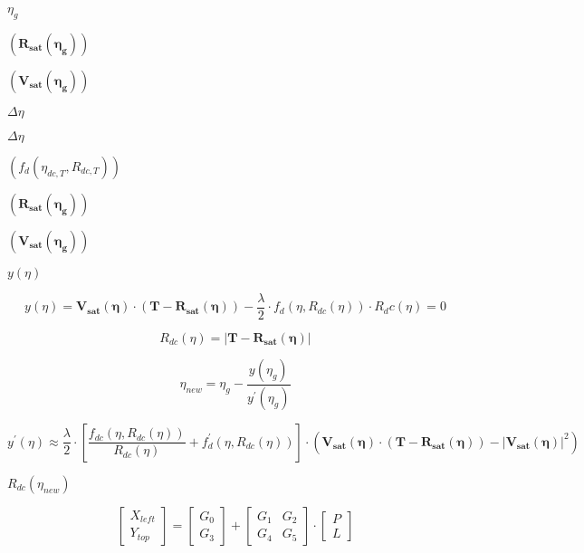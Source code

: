 \documentclass{article}
\begin{document}
$\eta_g$
\pagebreak

$\left( \mathbf{R_{sat}\left( \eta_g\right)} \right)$
\pagebreak

$ \left( \mathbf{V_{sat}\left( \eta_g \right)} \right)$
\pagebreak

$\Delta \eta $
\pagebreak

$\Delta \eta$
\pagebreak

$\left( f_d\left(\eta_{dc,T}, R_{dc,T}\right)\right)$
\pagebreak

$\left( \mathbf{R_{sat}\left( \eta_g \right)} \right)$
\pagebreak

$\left( \mathbf{V_{sat}\left( \eta_g \right)} \right)$
\pagebreak

$y\left( \eta \right)$
\pagebreak

\[ y\left( \eta \right) = \mathbf{V_{sat}\left(\eta\right)} \cdot \left( \mathbf{T} - \mathbf{R_{sat}\left( \eta \right)}\right) - \frac{\lambda}{2} \cdot f_d\left( \eta, R_{dc}\left(\eta\right)\right) \cdot R_dc\left( \eta \right) = 0 \]
\pagebreak

\[ R_{dc}\left(\eta \right) = \left| \mathbf{T} - \mathbf{R_{sat}\left(\eta\right)}\right| \]
\pagebreak

\[ \eta_{new} = \eta_g - \frac{y\left( \eta_g \right)}{y^{\prime}\left( \eta_g\right)} \]
\pagebreak

\[ y^{\prime}\left( \eta \right) \approx \frac{\lambda}{2} \cdot \left[ \frac{ f_{dc}\left( \eta, R_{dc}\left( \eta \right) \right)}{R_{dc}\left( \eta \right)} + f_d^{\prime}\left( \eta, R_{dc}\left( \eta \right) \right) \right] \cdot \left( \mathbf{V_{sat}\left( \eta \right)} \cdot \left( \mathbf{T} - \mathbf{R_{sat}\left(\eta\right)} \right) - \left| \mathbf{V_{sat}\left( \eta \right)}\right|^2 \right) \]
\pagebreak

$R_{dc}\left( \eta_{new} \right)$
\pagebreak

\[ \left[ \begin{array}{c} X_{left} \\ Y_{top} \end{array} \right] = \left[ \begin{array}{c} G_0 \\ G_3 \end{array}\right] + \left[ \begin{array}{cc} G_1 & G_2 \\ G_4 & G_5 \end{array} \right] \cdot \left[ \begin{array}{c} P \\ L \end{array} \right] \]
\pagebreak
\end{document}
